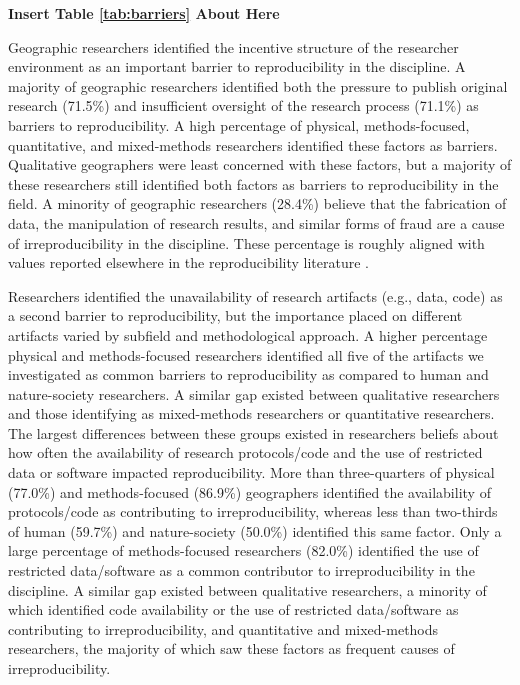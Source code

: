 \documentclass[]{interact}
\theoremstyle{plain}%
\theoremstyle{definition}
\theoremstyle{remark}
\begin{document}
\begin{center}
\textbf{Insert Table \ref{tab:barriers} About Here}
\end{center}

Geographic researchers identified the incentive structure of the researcher environment as an important barrier to reproducibility in the discipline.
A majority of geographic researchers identified both the pressure to publish original research (71.5\%) and insufficient oversight of the research process (71.1\%) as barriers to reproducibility.
A high percentage of physical, methods-focused, quantitative, and mixed-methods researchers identified these factors as barriers. 
Qualitative geographers were least concerned with these factors, but a majority of these researchers still identified both factors as barriers to reproducibility in the field.
A minority of geographic researchers (28.4\%) believe that the fabrication of data, the manipulation of research results, and similar forms of fraud are a cause of irreproducibility in the discipline.
These percentage is roughly aligned with values reported elsewhere in the reproducibility literature \citep{fanelli2009many, baker20161}.

Researchers identified the unavailability of research artifacts (e.g., data, code) as a second barrier to reproducibility, but the importance placed on different artifacts varied by subfield and methodological approach.
A higher percentage physical and methods-focused researchers identified all five of the artifacts we investigated as common barriers to reproducibility as compared to human and nature-society researchers.
A similar gap existed between qualitative researchers and those identifying as mixed-methods researchers or quantitative researchers. 
The largest differences between these groups existed in researchers beliefs about how often the availability of research protocols/code and the use of restricted data or software impacted reproducibility.
More than three-quarters of physical (77.0\%) and methods-focused (86.9\%) geographers identified the availability of protocols/code as contributing to irreproducibility, whereas less than two-thirds of human (59.7\%) and nature-society (50.0\%) identified this same factor. 
Only a large percentage of methods-focused researchers (82.0\%) identified the use of restricted data/software as a common contributor to irreproducibility in the discipline.
A similar gap existed between qualitative researchers, a minority of which identified code availability or the use of restricted data/software as contributing to irreproducibility, and quantitative and mixed-methods researchers, the majority of which saw these factors as frequent causes of irreproducibility.  
\end{document}
